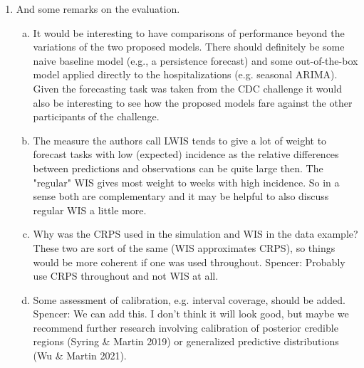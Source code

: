 \documentclass{article}
\newcommand{\spencer}[1]{{\color{green} Spencer: #1}}
\begin{document}
\begin{enumerate}[1.]
\begin{enumerate}[a.]
\item Currently the ILI value from the same week is used in equation (7). Would there be a point in
exploring different lags?
\spencer{Exploring different lags is an important idea here, especially considering there
may be a reporting lag. However, the reporting lag is not as big an issue as it has
been in the past. We assessed ILI lags for both one and two weeks previous to the current
week and found that ILI had less predictive power. }

\item On page 14 it says: "all negative values of [...] were set to 0 to reflect realistic values of
hospitalizations". Could this be handled more naturally by appropriate distributional assumptions?

\end{enumerate}


\item And some remarks on the evaluation.

\begin{enumerate}[a.]

\item It would be interesting to have comparisons of performance beyond the variations of the two
proposed models. There should definitely be some naive baseline model (e.g., a persistence
forecast) and some out-of-the-box model applied directly to the hospitalizations (e.g. seasonal
ARIMA). Given the forecasting task was taken from the CDC challenge it would also be interesting
to see how the proposed models fare against the other participants of the challenge.

\item The measure the authors call LWIS tends to give a lot of weight to forecast tasks with low
(expected) incidence as the relative differences between predictions and observations can be quite
large then. The "regular" WIS gives most weight to weeks with high incidence. So in a sense both
are complementary and it may be helpful to also discuss regular WIS a little more.

\item Why was the CRPS used in the simulation and WIS in the data example? These two are sort of
the same (WIS approximates CRPS), so things would be more coherent if one was used throughout.
\spencer{Probably use CRPS throughout and not WIS at all.}

\item Some assessment of calibration, e.g. interval coverage, should be added.
\spencer{We can add this. I don't think it will look good, but maybe we recommend
further research involving calibration of posterior credible regions (Syring \& Martin 2019)
or generalized predictive distributions (Wu \& Martin 2021).}


\end{enumerate}
\end{enumerate}
\end{document}
